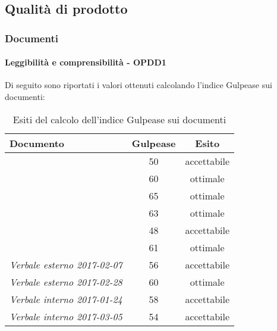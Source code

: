 \documentclass[PdQ.tex]{subfiles}
\begin{document}
\newpage		
\subsection{Qualità di prodotto}
	\subsubsection{Documenti}
		\paragraph{Leggibilità e comprensibilità - OPDD1}
				Di seguito sono riportati i valori ottenuti calcolando l'indice Gulpease sui documenti:
				\begin{table}[h]
				\centering
				\begin{tabular}{l c c}
					\hline
					\rule[-0.3cm]{0cm}{0.8cm}
					\textbf{Documento} & \textbf{Gulpease} & \textbf{Esito} \\
					\hline
					\rule[0cm]{0cm}{0.4cm}
					\PPdocRP & 50 & accettabile \\
					\rule[0cm]{0cm}{0.4cm}
					\NPdocRP &  60 & ottimale \\ 
					\rule[0cm]{0cm}{0.4cm}
					\ARdocRP & 65 & ottimale \\ 
					\rule[0cm]{0cm}{0.4cm}
					\PQdocRP & 63 & ottimale \\ 
					\rule[0cm]{0cm}{0.4cm}
					\Gldoc & 48 & accettabile\\ 
					\rule[0cm]{0cm}{0.4cm}
					\DPdoc & 61 & ottimale\\ 
					\rule[0cm]{0cm}{0.4cm}
					\textit{Verbale esterno 2017-02-07} & 56 & accettabile\\ 
					\rule[0cm]{0cm}{0.4cm}
					\textit{Verbale esterno 2017-02-28} & 60 & ottimale\\ 
					\rule[0cm]{0cm}{0.4cm}
					\textit{Verbale interno 2017-01-24} & 58 & accettabile\\ 
					\rule[0cm]{0cm}{0.4cm}
					\textit{Verbale interno 2017-03-05} & 54& accettabile\\ 
					
					\hline
				\end{tabular}
				\caption{Esiti del calcolo dell'indice Gulpease sui documenti}
			\end{table}		
\end{document}
